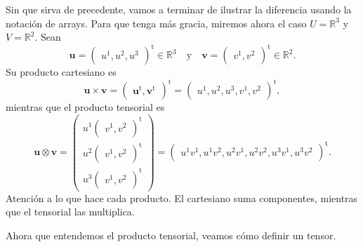 \begin{example}
    Sin que sirva de precedente, vamos a terminar de ilustrar la diferencia usando la notación de arrays. Para que tenga más gracia, miremos ahora el caso \(U=\mathbb{R}^3\) y \(V=\mathbb{R}^2\). Sean 
    \begin{equation*}
        \mathbf{u} = \begin{pmatrix}
            u^1, u^2, u^3
        \end{pmatrix}^\mathrm{t}\in\mathbb{R}^3\quad\text{y}\quad
        \mathbf{v} = \begin{pmatrix}
            v^1,v^2
        \end{pmatrix}^\mathrm{t}\in\mathbb{R}^2.
    \end{equation*}
    Su producto cartesiano es 
    \begin{equation*}
        \mathbf{u}\times\mathbf{v} = \begin{pmatrix}
            \mathbf{u}^\mathrm{t},\mathbf{v}^\mathrm{t}
        \end{pmatrix}^\mathrm{t} = \begin{pmatrix}
            u^1,u^2,u^3,v^1,v^2
        \end{pmatrix}^\mathrm{t},
    \end{equation*}
    mientras que el producto tensorial es 
    \begin{equation*}
        \mathbf{u}\otimes\mathbf{v} = \begin{pmatrix}
            u^1\begin{pmatrix}
                v^1,v^2
            \end{pmatrix}^\mathrm{t}\\
            u^2\begin{pmatrix}
                v^1,v^2
            \end{pmatrix}^\mathrm{t}\\
            u^3\begin{pmatrix}
                v^1,v^2
            \end{pmatrix}^\mathrm{t}
        \end{pmatrix} = 
        \begin{pmatrix}
            u^1v^1,u^1v^2,u^2v^1,u^2v^2,u^3v^1,u^3v^2
        \end{pmatrix}^\mathrm{t}.
    \end{equation*}
    Atención a lo que hace cada producto. El cartesiano suma componentes, mientras que el tensorial las multiplica.
\end{example}
Ahora que entendemos el producto tensorial, veamos cómo definir un tensor. 

